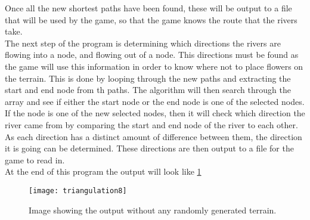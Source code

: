 	Once all the new shortest paths have been found, these will be output to a file that will be used by the game, so that the game knows the route that the rivers take.\\
	The next step of the program is determining which directions the rivers are flowing into a node, and flowing out of a node. This directions must be found as the game will use this information in order to know where not to place flowers on the terrain. This is done by looping through the new paths and extracting the start and end node from th paths. The algorithm will then search through the array and see if either the start node or the end node is one of the selected nodes. If the node is one of the new selected nodes, then it will check which direction the river came from by comparing the start and end node of the river to each other. As each direction has a distinct amount of difference between them, the direction it is going can be determined. These directions are then output to a file for the game to read in.\\


	At the end of this program the output will look like \ref{fig:triangulation8}

\begin{figure}[H]
	\texttt{[image: triangulation8]}
	\centering
	\caption{Image showing the output without any randomly generated terrain.}
	\label{fig:triangulation8}
\end{figure}

